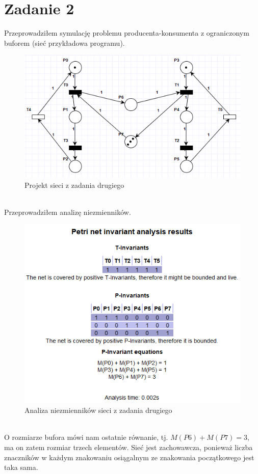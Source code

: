 \documentclass{article}
\begin{document}
    \newpage
    \section{Zadanie 2}
        Przeprowadziłem symulację problemu producenta-konsumenta z ograniczonym buforem (sieć przykładowa programu).
        \begin{figure}[h!]
            \centering
            \includegraphics[width=15cm]{lab6/n2.png}
            \caption{Projekt sieci z zadania drugiego}
        \end{figure}\\
        Przeprowadziłem analizę niezmienników.
        \begin{figure}[h!]
            \centering
            \includegraphics[width=14cm]{lab6/n2_1.png}
            \caption{Analiza niezmienników sieci z zadania drugiego}
        \end{figure}\\
        O rozmiarze bufora mówi nam ostatnie równanie, tj. $M(P6) + M(P7) = 3$, ma on zatem rozmiar trzech elementów.
        Sieć jest zachowawcza, ponieważ liczba znaczników w każdym znakowaniu osiągalnym ze znakowania początkowego jest taka sama.
\end{document}
